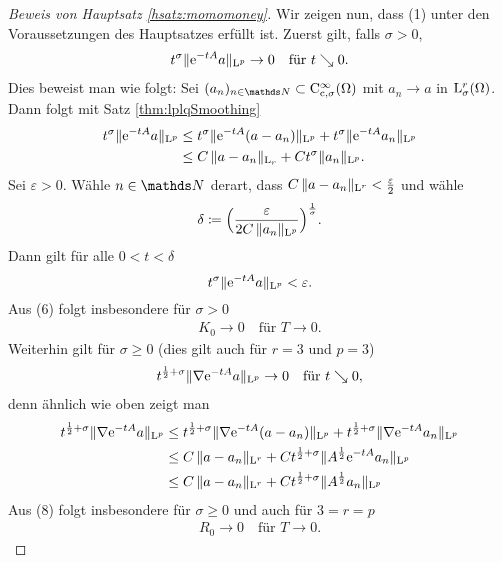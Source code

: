 \begin{proof}[Beweis von Hauptsatz \ref{hsatz:momomoney}]
  Wir zeigen nun, dass (1) unter den Voraussetzungen des Hauptsatzes erfüllt ist.
  Zuerst gilt, falls $\sigma > 0$,
  \begin{align}
    t^\sigma \|\mathrm{e}^{-t A} a \|_{\mathrm{L}^p} \to 0 \quad\text{für } t \searrow 0.
  \end{align}
  Dies beweist man wie folgt:
  Sei $(a_n)_{n \in \N} \subset \CC_{\cc,\sigma}^\infty(\Omega)$ mit $a_n \to a$ in $\mathrm{L}^r_\sigma(\Omega)$.
  Dann folgt mit Satz \ref{thm:lplqSmoothing}
  \begin{align*}
    t^\sigma \|\mathrm{e}^{-t A} a \|_{\mathrm{L}^p} 
    &\leq t^\sigma \|\mathrm{e}^{-tA} (a - a_n) \|_{\mathrm{L}^p} + t^\sigma \|\mathrm{e}^{-tA} a_n \|_{\mathrm{L}^p} \\
    &\leq C\, \|a - a_n\|_{\mathrm{L}_r} + C t^\sigma \|a_n\|_{\mathrm{L}^p}.
  \end{align*}
  Sei $\varepsilon > 0$.
  Wähle $n \in \N$ derart, dass $C\, \|a - a_n\|_{\mathrm{L}^r} < \frac{\varepsilon}{2}$ und wähle
  $$
  \delta \coloneqq \Big( \frac{\varepsilon }{2 C \, \|a_n\|_{\mathrm{L}^p}} \Big)^{\frac{1}{\sigma}}.
  $$
  Dann gilt für alle $0 < t < \delta$
  $$
  t^\sigma \|\mathrm{e}^{-t A} a \|_{\mathrm{L}^p} < \varepsilon.
  $$
  Aus (6) folgt insbesondere für $\sigma > 0$
  \begin{align}
    K_0 \to 0 \quad\text{für } T \to 0.
  \end{align}
  Weiterhin gilt für $\sigma \geq 0$ (dies gilt auch für $r = 3$ und $p = 3$)
  \begin{align}
    t^{\frac{1}{2} + \sigma} \|\nabla \mathrm{e}^{-t A} a \|_{\mathrm{L}^p} \to 0 \quad\text{für } t \searrow 0,
  \end{align}
  denn ähnlich wie oben zeigt man
  \begin{align*}
    t^{\frac{1}{2} + \sigma} \|\nabla \mathrm{e}^{-t A} a \|_{\mathrm{L}^p}
    &\leq t^{\frac{1}{2} + \sigma} \|\nabla \mathrm{e}^{-tA} (a - a_n)\|_{\mathrm{L}^p} + t^{\frac{1}{2} + \sigma} \|\nabla \mathrm{e}^{-tA} a_n \|_{\mathrm{L}^p} \\
    &\leq C\, \|a - a_n\|_{\mathrm{L}^r} + C t^{\frac{1}{2} + \sigma} \|A^{\frac{1}{2}} \mathrm{e}^{-t A} a_n \|_{\mathrm{L}^p} \\
    &\leq C \, \|a - a_n\|_{\mathrm{L}^r} + C t^{\frac{1}{2} + \sigma} \|A^{\frac{1}{2}} a_n \|_{\mathrm{L}^p}
  \end{align*}
  Aus (8) folgt insbesondere für $\sigma \geq 0$ und auch für $3 = r = p$
  \begin{align}
    R_0 \to 0 \quad\text{für } T \to 0.
  \end{align}


\end{proof}

